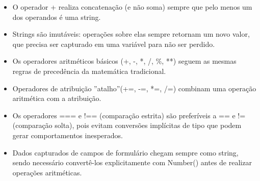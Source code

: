 \begin{itemize}
  \item O operador + realiza concatenação (e não soma) sempre que pelo menos um dos operandos é uma string.
\end{itemize}

\begin{itemize}
  \item Strings são imutáveis: operações sobre elas sempre retornam um novo valor, que precisa ser capturado em uma variável para não ser perdido.
\end{itemize}

\begin{itemize}
  \item Os operadores aritméticos básicos (+, -, *, /, \%, **) seguem as mesmas regras de precedência da matemática tradicional.
\end{itemize}

\begin{itemize}
  \item Operadores de atribuição ”atalho”(+=, -=, *=, /=) combinam uma operação aritmética com a atribuição.
\end{itemize}

\begin{itemize}
  \item Os operadores === e !== (comparação estrita) são preferíveis a == e != (comparação solta), pois evitam conversões implícitas de tipo que podem gerar comportamentos inesperados.
\end{itemize}

\begin{itemize}
  \item Dados capturados de campos de formulário chegam sempre como string, sendo necessário convertê-los explicitamente com Number() antes de realizar operações aritméticas.
\end{itemize}
